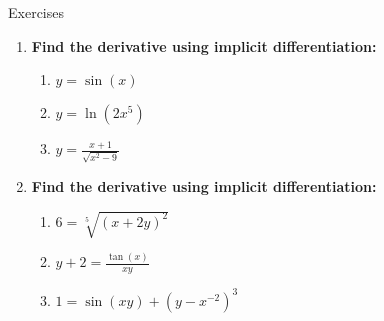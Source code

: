 \documentclass[../revisedMain.tex]{subfiles}
\begin{document}
	\begin{center}
		{\Large Exercises}
	\end{center}
	\begin{enumerate}
		\item\textbf{Find the derivative using implicit differentiation:}
		\begin{enumerate}
			\item $y=\sin(x)$
			\item $y=\ln(2x^5)$
			\item $y=\displaystyle\frac{x+1}{\sqrt{x^2-9}}$
		\end{enumerate}
		\item\textbf{Find the derivative using implicit differentiation:}
		\begin{enumerate}
			\item $6=\sqrt[5]{(x+2y)^2}$
			\item $y+2=\displaystyle\frac{\tan(x)}{xy}$
			\item $1=\sin(xy)+(y-x^{-2})^3$
		\end{enumerate}
	\end{enumerate}
\end{document}
